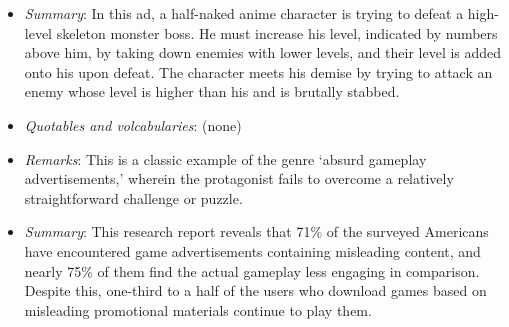 \documentclass[a4paper, 12pt, mla]{homework}
\begin{document}
\begin{abibliography}
	\begin{itemize}
		\item \textit{Summary}:
			In this ad, a half-naked anime character is trying to defeat a high-level skeleton monster boss. 
			He must increase his level, indicated by numbers above him, by taking down enemies with lower levels, and their level is added onto his upon defeat. 
			The character meets his demise by trying to attack an enemy whose level is higher than his and is brutally stabbed.
		\item \textit{Quotables and volcabularies}: (none)
		\item \textit{Remarks}:
			This is a classic example of the genre `absurd gameplay advertisements,' wherein the protagonist fails to overcome a relatively straightforward challenge or puzzle.
	\end{itemize}


	\begin{itemize}
		\item \textit{Summary}:
			This research report reveals that 71\% of the surveyed Americans have encountered game advertisements containing misleading content, and nearly 75\% of them find the actual gameplay less engaging in comparison. 
			Despite this, one-third to a half of the users who download games based on misleading promotional materials continue to play them.
			

\end{itemize}
\end{abibliography}
\end{document}
